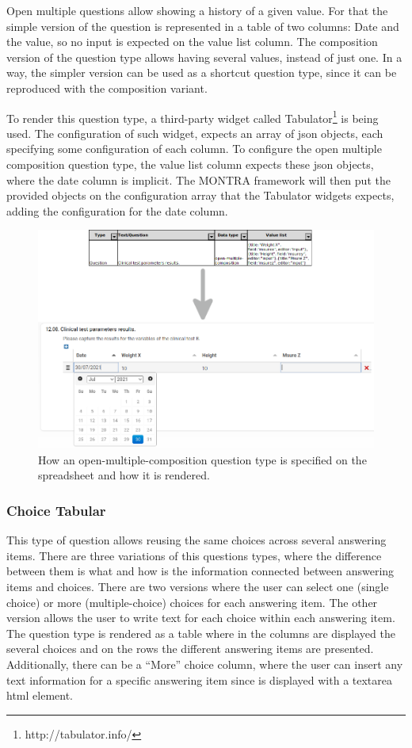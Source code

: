Open multiple questions allow showing a history of a given value.
For that the simple version of the question is represented in a table of two columns: Date and the value, so no input is expected on the value list column.
The composition version of the question type allows having several values, instead of just one.
In a way, the simpler version can be used as a shortcut question type, since it can be reproduced with the composition variant.

To render this question type, a third-party widget called Tabulator\footnote{http://tabulator.info/} is being used.
The configuration of such widget, expects an array of \gls{json} objects, each specifying some configuration of each column.
To configure the open multiple composition question type, the value list column expects these \gls{json} objects, where the date column is implicit.
The MONTRA framework will then put the provided objects on the configuration array that the Tabulator widgets expects, adding the configuration for the date column.

\begin{figure}
    \center
    \includegraphics[width=\textwidth]{open-multiple}
    \caption{How an open-multiple-composition question type is specified on the spreadsheet and how it is rendered.}
    \label{fig:open-multiple}
\end{figure}

\subsubsection*{Choice Tabular}

This type of question allows reusing the same choices across several answering items.
There are three variations of this questions types, where the difference between them is what and how is the information connected between answering items and choices.
There are two versions where the user can select one (single choice) or more (multiple-choice) choices for each answering item.
The other version allows the user to write text for each choice within each answering item.
The question type is rendered as a table where in the columns are displayed the several choices and on the rows the different answering items are presented.
Additionally, there can be a ``More'' choice column, where the user can insert any text information for a specific answering item since is displayed with a textarea \gls{html} element.

